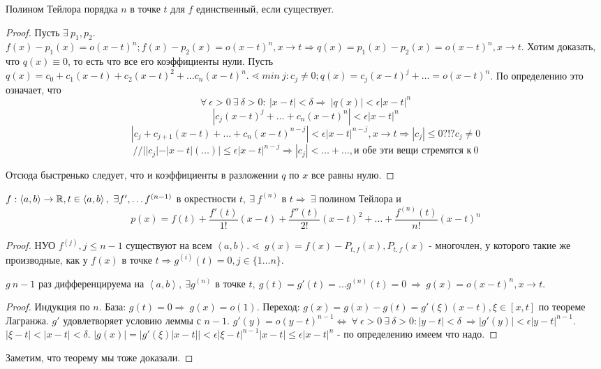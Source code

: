 \documentclass[12pt]{report}
\begin{document}
\begin{st}
Полином Тейлора порядка $n$ в точке $t$ для $f$ единственный, если существует.
\end{st}
\begin{proof}
Пусть $\exists ~p_1, p_2$. $f(x) - p_1(x) = o(x - t)^n; f(x) - p_2(x) = o(x - t)^n, x \to t \Rightarrow q(x) = p_1(x) - p_2(x) = o(x - t)^n, x \to t$. Хотим доказать, что $q(x) \equiv 0$, то есть что все его коэффициенты нули. Пусть $q(x) = c_0 + c_1(x - t) + c_2(x - t)^2 + \dots c_n(x - t)^n. \lessdot min ~j: c_j \neq 0; q(x) = c_j(x - t)^j + \dots = o(x - t)^n$. По определению это означает, что $$\forall ~\epsilon > 0 ~\exists ~\delta > 0: ~|x - t| < \delta \Rightarrow ~|q(x)| < \epsilon|x - t|^n$$
$$|c_j(x - t)^j + \dots + c_n(x - t)^n| < \epsilon |x - t|^n$$
$$|c_j + c_{j + 1}(x - t) + \dots + c_n(x - t)^{n - j}| < \epsilon |x - t|^{n - j}, x \to t \Rightarrow |c_j| \le 0 ?!? c_j \neq 0$$
$$// ||c_j| - |x - t|(\dots)| \le \epsilon|x - t|^{n - j} \Rightarrow |c_j| < \dots + \dots, \mbox{и обе эти вещи стремятся к} ~0$$

Отсюда быстренько следует, что и коэффициенты в разложении $q$ по $x$ все равны нулю.
\end{proof}
\begin{thm}
$f: \left<a, b\right> \to \mathbb{R}, t \in \left<a, b\right>, ~\exists f', \dots f^{(n - 1)}$ в окрестности $t, ~\exists ~f^{(n)}$ в $t \Rightarrow ~\exists$ полином Тейлора и
$$p(x) = f(t) + \frac{f'(t)}{1!}(x - t) + \frac{f''(t)}{2!}(x - t)^2 + \dots + \frac{f^{(n)}(t)}{n!}(x - t)^n$$
\end{thm}
\begin{proof}
НУО $f^{(j)}, j \le n - 1$ существуют на всем $\left<a, b\right>. \lessdot ~g(x) = f(x) - P_{t, f}(x), P_{t, f}(x)$ - многочлен, у которого такие же производные, как у $f(x)$ в точке $t \Rightarrow g^{(i)}(t) = 0, j \in \{1 \dots n\}$.

\begin{lm}
$g  ~n - 1$ раз дифференцируема на $\left<a, b\right>, ~\exists g^{(n)}$ в точке $t, ~g(t) = g'(t) = \dots g^{(n)}(t) = 0 ~\Rightarrow ~g(x) = o(x - t)^n, x \to t$.
\end{lm}
\begin{proof}
Индукция по $n$. База: $g(t) = 0 \Rightarrow ~g(x) = o(1)$. Переход: $g(x) = g(x) - g(t) = g'(\xi)(x - t), \xi \in [x, t]$ по теореме Лагранжа. $g'$ удовлетворяет условию леммы с $n - 1$. $g'(y) = o(y - t)^{n - 1} \Leftrightarrow  ~\forall ~\epsilon > 0 ~\exists ~\delta > 0: |y - t| < \delta ~\Rightarrow |g'(y)| < \epsilon|y - t|^{n - 1}.$ $|\xi - t| < |x - t| < \delta$. $|g(x)| = |g'(\xi)|x - t|| < \epsilon |\xi - t|^{n - 1}|x - t| \le \epsilon |x - t|^n$ - по определению имеем что надо.
\end{proof}

Заметим, что теорему мы тоже доказали.
\end{proof}
\end{document}
